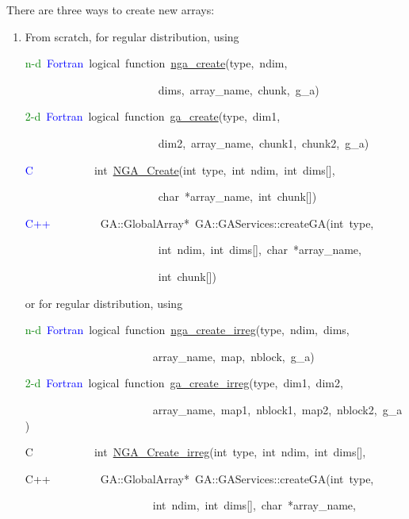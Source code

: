 There are three ways to create new arrays:
\begin{enumerate}
\item From scratch, for regular distribution, using

\begin{lyxcode}
\textcolor{green}{n-d}~\textcolor{blue}{Fortran}~logical~function~\href{http://www.emsl.pnl.gov/docs/global/ga_ops.html\#ga_create}{nga\_{}create}(type,~ndim,~

~~~~~~~~~~~~~~~~~~~~~~~~dims,~array\_name,~chunk,~g\_a)~

\textcolor{green}{2-d}~\textcolor{blue}{Fortran}~logical~function~\href{http://www.emsl.pnl.gov/docs/global/ga_ops.html\#ga_create}{ga\_{}create}(type,~dim1,~

~~~~~~~~~~~~~~~~~~~~~~~~dim2,~array\_name,~chunk1,~chunk2,~g\_a)~

\textcolor{blue}{C}~~~~~~~~~~~int~\href{http://www.emsl.pnl.gov/docs/global/c_nga_ops.html\#ga_create}{NGA\_{}Create}(int~type,~int~ndim,~int~dims{[}{]},~

~~~~~~~~~~~~~~~~~~~~~~~~char~{*}array\_name,~int~chunk{[}{]})~

\textcolor{blue}{C++}~~~~~~~~~GA::GlobalArray{*}~GA::GAServices::createGA(int~type,~

~~~~~~~~~~~~~~~~~~~~~~~~int~ndim,~int~dims{[}{]},~char~{*}array\_name,~

~~~~~~~~~~~~~~~~~~~~~~~~int~chunk{[}{]})
\end{lyxcode}
or for regular distribution, using
\begin{lyxcode}
\textcolor{green}{n-d}~\textcolor{blue}{Fortran}~logical~function~\href{http://www.emsl.pnl.gov/docs/global/ga_ops.html\#ga_create_irreg}{nga\_{}create\_{}irreg}(type,~ndim,~dims,

~~~~~~~~~~~~~~~~~~~~~~~array\_name,~map,~nblock,~g\_a)~

\textcolor{green}{2-d}~\textcolor{blue}{Fortran}~logical~function~\href{http://www.emsl.pnl.gov/docs/global/ga_ops.html\#ga_create_irreg}{ga\_{}create\_{}irreg}(type,~dim1,~dim2,

~~~~~~~~~~~~~~~~~~~~~~~array\_name,~map1,~nblock1,~map2,~nblock2,~g\_a)~

C~~~~~~~~~~~int~\href{http://www.emsl.pnl.gov/docs/global/c_nga_ops.html\#ga_create_irreg}{NGA\_{}Create\_{}irreg}(int~type,~int~ndim,~int~dims{[}{]},~

C++~~~~~~~~~GA::GlobalArray{*}~GA::GAServices::createGA(int~type,~

~~~~~~~~~~~~~~~~~~~~~~~int~ndim,~int~dims{[}{]},~char~{*}array\_name,~


\end{lyxcode}
\end{enumerate}
